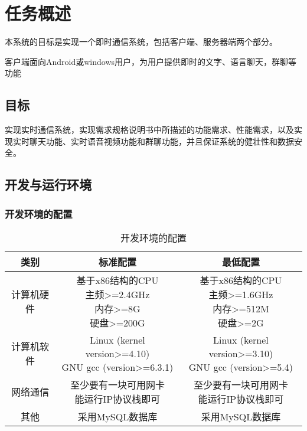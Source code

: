 \chapter{任务概述}
本系统的目标是实现一个即时通信系统，包括客户端、服务器端两个部分。

客户端面向Android或windows用户，为用户提供即时的文字、语言聊天，群聊等功能

\section{目标}
实现实时通信系统，实现需求规格说明书中所描述的功能需求、性能需求，以及实现实时聊天功能、实时语音视频功能和群聊功能，并且保证系统的健壮性和数据安全。

\section{开发与运行环境}

\subsection{开发环境的配置}
\begin{table}[htbp]
\centering
\caption{开发环境的配置} \label{tab:development-environment}
\begin{tabular}{|c|c|c|}
    \hline
    类别 & 标准配置 & 最低配置 \\
    \hline
    计算机硬件 & \tabincell{c}{基于x86结构的CPU\\ 主频>=2.4GHz\\ 内存>=8G\\ 硬盘>=200G} & \tabincell{c}{基于x86结构的CPU\\ 主频>=1.6GHz\\ 内存>=512M\\ 硬盘>=2G} \\
    \hline
    计算机软件 & \tabincell{c}{Linux (kernel version>=4.10)\\ GNU gcc (version>=6.3.1)} & \tabincell{c}{Linux (kernel version>=3.10)\\ GNU gcc (version>=5.4)} \\
    \hline
    网络通信 & \tabincell{c}{至少要有一块可用网卡\\ 能运行IP协议栈即可} & \tabincell{c}{至少要有一块可用网卡\\ 能运行IP协议栈即可} \\
    \hline
    其他 & 采用MySQL数据库 & 采用MySQL数据库 \\
    \hline
\end{tabular}
\end{table}

